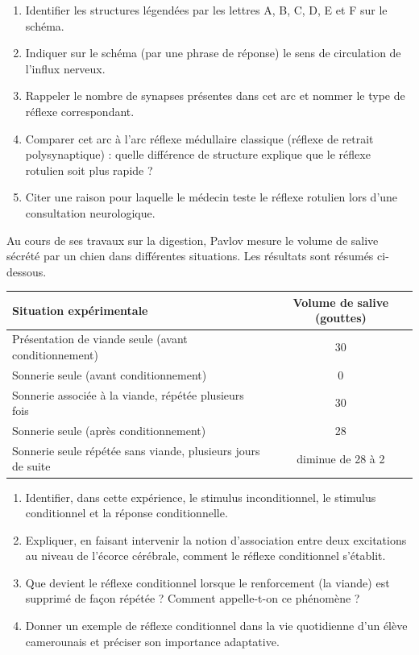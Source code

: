 \documentclass[11pt]{article}
\begin{document}
\begin{exercice}
\begin{enumerate}
\item Identifier les structures légendées par les lettres A, B, C, D, E et F sur le schéma.
\item Indiquer sur le schéma (par une phrase de réponse) le sens de circulation de l'influx nerveux.
\item Rappeler le nombre de synapses présentes dans cet arc et nommer le type de réflexe correspondant.
\item Comparer cet arc à l'arc réflexe médullaire classique (réflexe de retrait polysynaptique) : quelle différence de structure explique que le réflexe rotulien soit plus rapide ?
\item Citer une raison pour laquelle le médecin teste le réflexe rotulien lors d'une consultation neurologique.
\end{enumerate}
\end{exercice}

\begin{exercice}
Au cours de ses travaux sur la digestion, Pavlov mesure le volume de salive sécrété par un chien dans différentes situations. Les résultats sont résumés ci-dessous.

\begin{center}
\begin{tabularx}{\linewidth}{|X|c|}
\hline
\rowcolor{popblueL} \textbf{Situation expérimentale} & \textbf{Volume de salive (gouttes)} \\
\hline
Présentation de viande seule (avant conditionnement) & 30 \\
\hline
Sonnerie seule (avant conditionnement) & 0 \\
\hline
Sonnerie associée à la viande, répétée plusieurs fois & 30 \\
\hline
Sonnerie seule (après conditionnement) & 28 \\
\hline
Sonnerie seule répétée sans viande, plusieurs jours de suite & diminue de 28 à 2 \\
\hline
\end{tabularx}
\end{center}

\begin{enumerate}
\item Identifier, dans cette expérience, le stimulus inconditionnel, le stimulus conditionnel et la réponse conditionnelle.
\item Expliquer, en faisant intervenir la notion d'association entre deux excitations au niveau de l'écorce cérébrale, comment le réflexe conditionnel s'établit.
\item Que devient le réflexe conditionnel lorsque le renforcement (la viande) est supprimé de façon répétée ? Comment appelle-t-on ce phénomène ?
\item Donner un exemple de réflexe conditionnel dans la vie quotidienne d'un élève camerounais et préciser son importance adaptative.
\end{enumerate}
\end{exercice}
\end{document}
